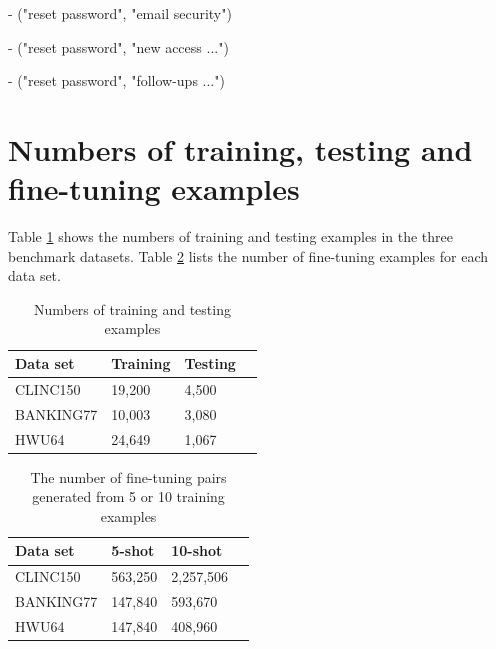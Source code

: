 \documentclass[sigconf, anonymous=true]{acmart}
\begin{document}
- ("reset password", "email security")

- ("reset password", "new access ...")

- ("reset password", "follow-ups ...")

\section{Numbers of training, testing and fine-tuning examples}
\label{sec:noExamples}

Table \ref{tab:NumTrainTest} shows the numbers of training and testing examples in the three benchmark datasets.
Table \ref{tab:NumFineTuning} lists the number of fine-tuning examples for each data set.

\begin{table}[H]
\setlength{} %
\footnotesize\centering
\begin{tabular}{llll}
\hline \textbf{Data set} & \textbf{Training} & \textbf{Testing} \\
\hline CLINC150 & 19,200 & 4,500  \\
BANKING77 & 10,003 & 3,080  \\
HWU64 & 24,649 & 1,067  \\
\hline
\end{tabular}
\caption{Numbers of training and testing examples}
\label{tab:NumTrainTest}
\end{table}

\begin{table}[H]
\setlength{} %
\footnotesize\centering
\begin{tabular}{llll}
\hline \textbf{Data set} & \textbf{5-shot} & \textbf{10-shot}\\
\hline CLINC150 & 563,250 & 2,257,506 \\
BANKING77 & 147,840 & 593,670  \\
HWU64 & 147,840 & 408,960  \\
\hline
\end{tabular}
\caption{The number of fine-tuning pairs generated from 5 or 10 training examples}
\label{tab:NumFineTuning}
\end{table}
\end{document}
